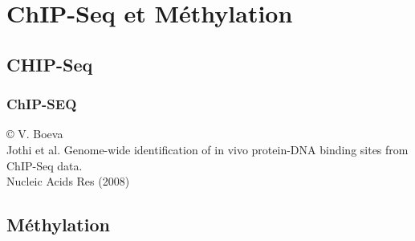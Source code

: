 \documentclass{beamer}
\begin{document}
\section{ChIP-Seq et Méthylation} %
\label{sec:capture_et_chip_seq}

\subsection{CHIP-Seq} %
\begin{frame}
	\frametitle{ChIP-SEQ}
		\tiny{© V. Boeva}\\
		\tiny{Jothi et al. Genome-wide identification of in vivo protein-DNA binding sites from ChIP-Seq data.\\ Nucleic Acids Res (2008)}
\end{frame}


\subsection{Méthylation} %
\label{sub:méthylation}
\end{document}

